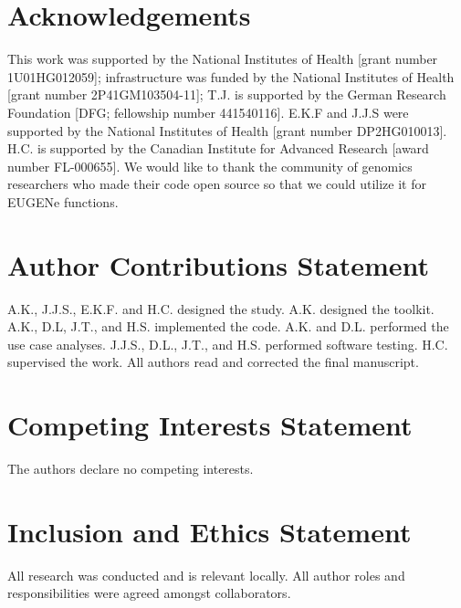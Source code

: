 \section{Acknowledgements}

This work was supported by the National Institutes of Health [grant number 1U01HG012059]; infrastructure was funded by the National Institutes of Health [grant number 2P41GM103504-11]; T.J. is supported by the German Research Foundation [DFG; fellowship number 441540116]. E.K.F and J.J.S were supported by the National Institutes of Health [grant number DP2HG010013]. H.C. is supported by the Canadian Institute for Advanced Research [award number FL-000655]. We would like to thank the community of genomics researchers who made their code open source so that we could utilize it for EUGENe functions.

\section{Author Contributions Statement}

A.K., J.J.S., E.K.F. and H.C. designed the study. A.K. designed the toolkit. A.K., D.L, J.T., and H.S. implemented the code. A.K. and D.L. performed the use case analyses. J.J.S., D.L., J.T., and H.S. performed software testing. H.C. supervised the work. All authors read and corrected the final manuscript.

\section{Competing Interests Statement}

The authors declare no competing interests.

\section{Inclusion and Ethics Statement}

All research was conducted and is relevant locally. All author roles and responsibilities were agreed amongst collaborators.
